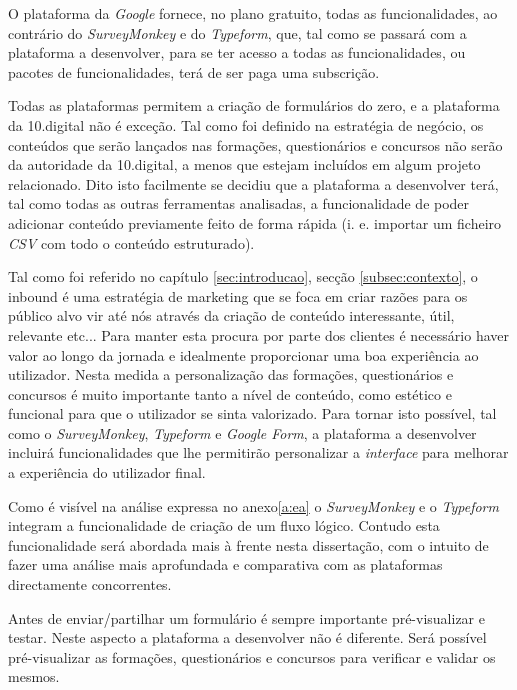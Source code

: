 O plataforma da \textit{Google} fornece, no plano gratuito, todas as funcionalidades, ao contrário do \textit{SurveyMonkey} e do \textit{Typeform}, que, tal como se passará com a plataforma a desenvolver, para se ter acesso a todas as funcionalidades, ou pacotes de funcionalidades, terá de ser paga uma subscrição.

Todas as plataformas permitem a criação de formulários do zero, e a plataforma da 10.digital não é exceção. Tal como foi definido na estratégia de negócio, os conteúdos que serão lançados nas formações, questionários e concursos não serão da autoridade da 10.digital, a menos que estejam incluídos em algum projeto relacionado. Dito isto facilmente se decidiu que a plataforma a desenvolver terá, tal como todas as outras ferramentas analisadas, a funcionalidade de poder adicionar conteúdo previamente feito de forma rápida (i. e. importar um ficheiro \textit{CSV} com todo o conteúdo estruturado). 


Tal como foi referido no capítulo \ref{sec:introducao}, secção \ref{subsec:contexto}, o inbound é uma estratégia de marketing que se foca em criar razões para os público alvo vir até nós através da criação de conteúdo interessante, útil, relevante etc... Para manter esta procura por parte dos clientes é necessário haver valor ao longo da jornada e idealmente proporcionar uma boa experiência ao utilizador. Nesta medida a personalização das formações, questionários e concursos é muito importante tanto a nível de conteúdo, como estético e funcional para que o utilizador se sinta valorizado. Para tornar isto possível, tal como o \textit{SurveyMonkey}, \textit{Typeform} e \textit{Google Form}, a plataforma a desenvolver incluirá funcionalidades que lhe permitirão personalizar a \textit{interface} para melhorar a experiência do utilizador final. 

Como é visível na análise expressa no anexo\ref{a:ea} o \textit{SurveyMonkey} e o \textit{Typeform} integram a funcionalidade de criação de um fluxo lógico. Contudo esta funcionalidade será abordada mais à frente nesta dissertação, com o intuito de fazer uma análise  mais aprofundada e comparativa com as plataformas directamente concorrentes.

Antes de enviar/partilhar um formulário é sempre importante pré-visualizar e testar. Neste aspecto a plataforma a desenvolver não é diferente. Será possível pré-visualizar as formações, questionários e concursos para verificar e validar os mesmos. 

